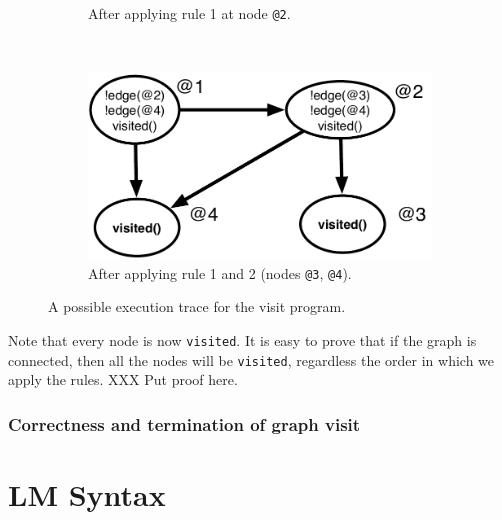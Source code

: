 \begin{figure}[h]
\begin{subfigure}[b]{0.5\textwidth}
                \caption{After applying rule 1 at node \texttt{@2}.}
                \label{fig:exec_trace3}
        \end{subfigure}%
        ~ %
        \begin{subfigure}[b]{0.5\textwidth}
                  \includegraphics[width=\textwidth]{figures/visit/trace4}
                  \caption{After applying rule 1 and 2 (nodes \texttt{@3},
                        \texttt{@4}).}
                  \label{fig:exec_trace4}
          \end{subfigure}
        \caption{A possible execution trace for the visit program.}\label{fig:exec_trace}
\end{figure}

Note that every node is now \texttt{visited}. It is easy to prove that if the
graph is connected, then all the nodes will be \texttt{visited}, regardless the
order in which we apply the rules. XXX Put proof here.

\subsubsection{Correctness and termination of graph visit}


\section{LM Syntax}

\renewcommand{\arraystretch}{1.5}

